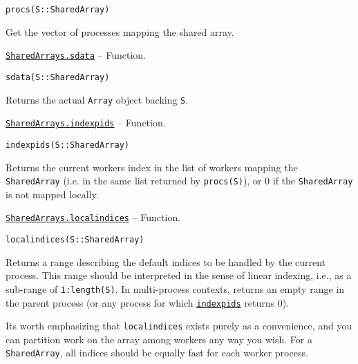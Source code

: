 \begin{adjustwidth}{2em}{0pt}


\begin{verbatim}
procs(S::SharedArray)
\end{verbatim}

Get the vector of processes mapping the shared array.



\end{adjustwidth}
\hypertarget{5828642841105091437}{}
\hyperlink{5828642841105091437}{\texttt{SharedArrays.sdata}}  -- {Function.}

\begin{adjustwidth}{2em}{0pt}


\begin{verbatim}
sdata(S::SharedArray)
\end{verbatim}

Returns the actual \texttt{Array} object backing \texttt{S}.



\end{adjustwidth}
\hypertarget{6331641514330199981}{}
\hyperlink{6331641514330199981}{\texttt{SharedArrays.indexpids}}  -- {Function.}

\begin{adjustwidth}{2em}{0pt}


\begin{verbatim}
indexpids(S::SharedArray)
\end{verbatim}

Returns the current worker{\textquotesingle}s index in the list of workers mapping the \texttt{SharedArray} (i.e. in the same list returned by \texttt{procs(S)}), or 0 if the \texttt{SharedArray} is not mapped locally.



\end{adjustwidth}
\hypertarget{12447667054613272081}{}
\hyperlink{12447667054613272081}{\texttt{SharedArrays.localindices}}  -- {Function.}

\begin{adjustwidth}{2em}{0pt}


\begin{verbatim}
localindices(S::SharedArray)
\end{verbatim}

Returns a range describing the {\textquotedbl}default{\textquotedbl} indices to be handled by the current process.  This range should be interpreted in the sense of linear indexing, i.e., as a sub-range of \texttt{1:length(S)}.  In multi-process contexts, returns an empty range in the parent process (or any process for which \hyperlink{6331641514330199981}{\texttt{indexpids}} returns 0).

It{\textquotesingle}s worth emphasizing that \texttt{localindices} exists purely as a convenience, and you can partition work on the array among workers any way you wish. For a \texttt{SharedArray}, all indices should be equally fast for each worker process.



\end{adjustwidth}

